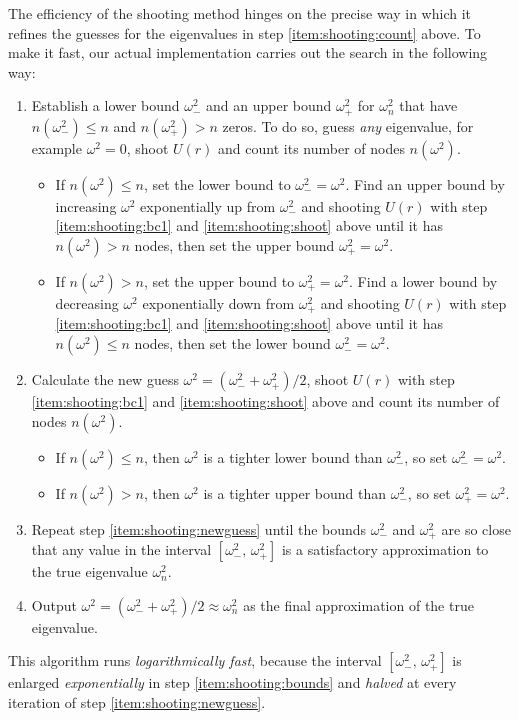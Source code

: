 The efficiency of the shooting method hinges on the precise way in which it refines the guesses for the eigenvalues in step \ref{item:shooting:count} above.
To make it fast, our actual implementation carries out the search in the following way:
\begin{enumerate}
\item Establish a lower bound $\omega_-^2$ and an upper bound $\omega_+^2$ for $\omega_n^2$ that have $n(\omega_-^2) \leq n$ and $n(\omega_+^2) > n$ zeros.
      To do so, guess \emph{any} eigenvalue, for example $\omega^2 = 0$, shoot $U(r)$ and count its number of nodes $n(\omega^2)$.
      \begin{itemize}
      \item If $n(\omega^2) \leq n$, set the lower bound to $\omega_-^2 = \omega^2$.
            Find an upper bound by increasing $\omega^2$ exponentially up from $\omega_-^2$ and shooting $U(r)$ with step \ref{item:shooting:bc1} and \ref{item:shooting:shoot} above until it has $n(\omega^2) > n$ nodes, then set the upper bound $\omega_+^2 = \omega^2$.
      \item If $n(\omega^2) >    n$, set the upper bound to $\omega_+^2 = \omega^2$.
            Find a lower bound by decreasing $\omega^2$ exponentially down from $\omega_+^2$ and shooting $U(r)$ with step \ref{item:shooting:bc1} and \ref{item:shooting:shoot} above until it has $n(\omega^2) \leq n$ nodes, then set the lower bound $\omega_-^2 = \omega^2$.
      \end{itemize}
      \label{item:shooting:bounds}
\item Calculate the new guess $\omega^2 = (\omega_-^2 + \omega_+^2) / 2$, shoot $U(r)$ with step \ref{item:shooting:bc1} and \ref{item:shooting:shoot} above and count its number of nodes $n(\omega^2)$. \label{item:shooting:newguess}
      \begin{itemize}
      \item If $n(\omega^2) \leq n$, then $\omega^2$ is a tighter lower bound than $\omega_-^2$, so set $\omega_-^2 = \omega^2$.
      \item If $n(\omega^2) >    n$, then $\omega^2$ is a tighter upper bound than $\omega_-^2$, so set $\omega_+^2 = \omega^2$.
      \end{itemize}
\item Repeat step \ref{item:shooting:newguess} until the bounds $\omega_-^2$ and $\omega_+^2$ are so close that any value in the interval $[\omega_-^2, \, \omega_+^2]$ is a satisfactory approximation to the true eigenvalue $\omega_n^2$.
\item Output $\omega^2 = (\omega_-^2 + \omega_+^2) / 2 \approx \omega_n^2$ as the final approximation of the true eigenvalue.
\end{enumerate}
This algorithm runs \emph{logarithmically fast}, because the interval $[\omega_-^2, \, \omega_+^2]$ is enlarged \emph{exponentially} in step \ref{item:shooting:bounds} and \emph{halved} at every iteration of step \ref{item:shooting:newguess}.

